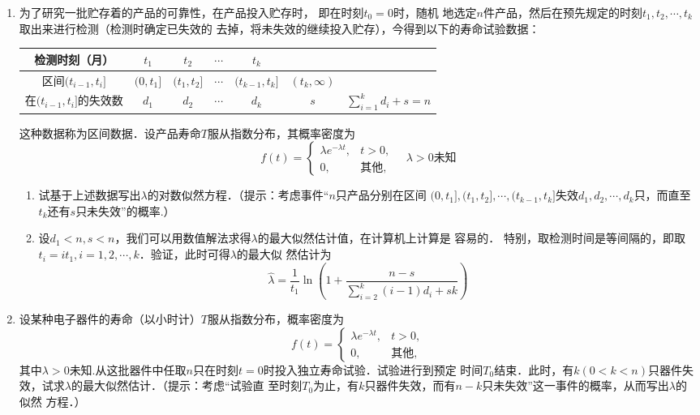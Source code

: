 \documentclass[10pt,a4paper]{article}
\begin{document}
\begin{enumerate}
    \item 为了研究一批贮存着的产品的可靠性，在产品投入贮存时， 即在时刻$t_0=0$时，随机
    地选定$n$件产品，然后在预先规定的时刻$t_1,t_2,\cdots,t_k$取出来进行检测（检测时确定已失效的
    去掉，将未失效的继续投入贮存），今得到以下的寿命试验数据：
    \renewcommand{\arraystretch}{1.4}
    \begin{table}[H]\centering
        \begin{tabular}{c|cccccc}
        \hline
        检测时刻（月）              & $t_1$     & $t_2$       & $\cdots$ & $t_k$           &                &                        \\ \hline
        区间$(t_{i-1},t_i]$    & $(0,t_1]$ & $(t_1,t_2]$ & $\cdots$ & $(t_{k-1},t_k]$ & $(t_k,\infty)$ &                        \\ \hline
        在$(t_{i-1},t_i]$的失效数 & $d_1$     & $d_2$    & $\cdots$ & $d_k$           & $s$              & $\displaystyle{\sum_{i=1}^k d_i+s=n}$ \\ \hline
        \end{tabular}
    \end{table}
    \renewcommand{\arraystretch}{1.0}
    这种数据称为区间数据．设产品寿命$T$服从指数分布，其概率密度为
    $$f(t)=\left\{\begin{array}{ll}
        \lambda e^{-\lambda t}, & t>0,\\
        0, & \mbox{其他},
    \end{array}\right.\quad \lambda>0\mbox{未知}$$
    \begin{enumerate}
        \item 试基于上述数据写出$\lambda$的对数似然方程．（提示：考虑事件“$n$只产品分别在区间
        $(0,t_1],(t_1,t_2],\cdots,(t_{k-1},t_k]$失效$d_1,d_2,\cdots,d_k$只，而直至$t_k$还有$s$只未失效”的概率.）
        \item 设$d_1<n,s<n$，我们可以用数值解法求得$\lambda$的最大似然估计值，在计算机上计算是
        容易的． 特别，取检测时间是等间隔的，即取$t_i=it_1,i=1,2,\cdots,k$．验证，此时可得$\lambda$的最大似
        然估计为
        $$\hat{\lambda}=\frac{1}{t_1}\ln\left(1+\frac{n-s}{\displaystyle{\sum_{i=2}^k(i-1)d_i+sk}}\right)$$
    \end{enumerate}  





    \item 设某种电子器件的寿命（以小时计）$T$服从指数分布，概率密度为
    $$f(t)=\left\{\begin{array}{ll}
        \lambda e^{-\lambda t}, & t>0,\\
        0, & \mbox{其他},
    \end{array}\right.$$
    其中$\lambda>0$未知.从这批器件中任取$n$只在时刻$t=0$时投入独立寿命试验．试验进行到预定
    时间$T_0$结束．此时，有$k(0<k<n)$只器件失效，试求$\lambda$的最大似然估计．（提示：考虑“试验直
    至时刻$T_0$为止，有$k$只器件失效，而有$n-k$只未失效”这一事件的概率，从而写出$\lambda$的似然
    方程．）







\end{enumerate}
\end{document}

